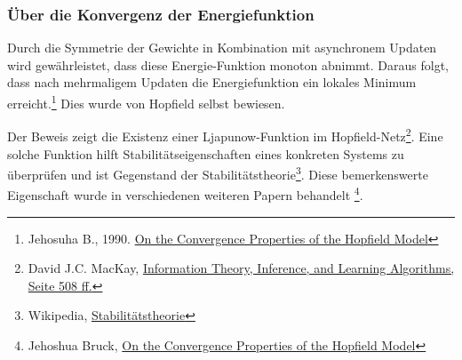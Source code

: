 \subsubsection*{Über die Konvergenz der Energiefunktion}

Durch die Symmetrie der Gewichte in Kombination mit asynchronem Updaten wird gewährleistet, dass diese Energie-Funktion monoton abnimmt. Daraus folgt, dass nach mehrmaligem Updaten die Energiefunktion ein lokales Minimum erreicht.\footnote{Jehosuha B., 1990. \href{ http://www.paradise.caltech.edu/CNS188/bruck90-conv.pdf}{On the Convergence Properties of the
Hopfield Model}} Dies wurde von Hopfield selbst bewiesen.

Der Beweis zeigt die Existenz einer Ljapunow-Funktion im Hopfield-Netz\footnote{David J.C. MacKay, \href{https://www.inference.org.uk/itprnn/book.pdf}{Information Theory, Inference, and Learning Algorithms, Seite 508 ff.}}. Eine solche Funktion hilft Stabilitätseigenschaften eines konkreten Systems zu überprüfen und ist Gegenstand der Stabilitätstheorie\footnote{Wikipedia, \href{https://de.wikipedia.org/wiki/Stabilitätstheorie}{Stabilitätstheorie}}. Diese bemerkenswerte Eigenschaft wurde in verschiedenen weiteren Papern behandelt \footnote{Jehoshua Bruck, \href{http://www.paradise.caltech.edu/CNS188/bruck90-conv.pdf}{On the Convergence Properties of the Hopfield Model}}.